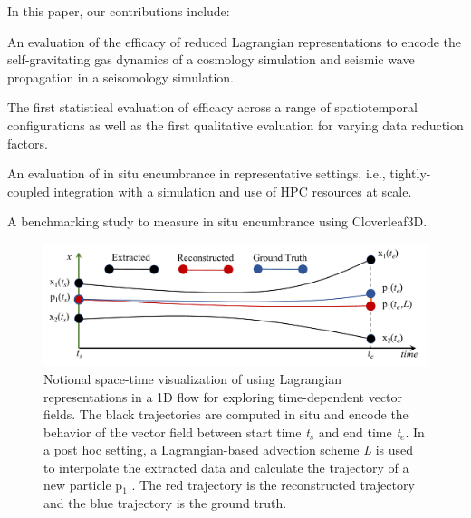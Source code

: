 In this paper, our contributions include:\begin{tightItemize}
\item An evaluation of the efficacy of reduced Lagrangian representations to encode the self-gravitating gas dynamics of a cosmology simulation and seismic wave propagation in a seisomology simulation.
\item The first statistical evaluation of efficacy across a range of spatiotemporal configurations as well as the first qualitative evaluation for varying data reduction factors.
\item An evaluation of in situ encumbrance in representative settings, i.e., tightly-coupled integration with a simulation and use of HPC resources at scale.
\item A benchmarking study to measure in situ encumbrance using Cloverleaf3D.
\end{tightItemize}

\begin{figure}[!t]
\centering
\includegraphics[width=0.8\linewidth]{Images/sample.pdf}
\vspace{-5mm}
\caption{Notional space-time visualization of using Lagrangian representations in a 1D flow for exploring time-dependent vector fields. The black trajectories are computed in situ and encode the behavior of the vector field between start time \textit{t$_{s}$} and end time \textit{t$_{e}$}. In a post hoc setting, a Lagrangian-based advection scheme \textit{L} is used to interpolate the extracted data and calculate the trajectory of a new particle p$_{1}$ . The red trajectory is the reconstructed trajectory and the blue trajectory is the ground truth.}
\vspace{-5mm}
\label{fig:sample}
\end{figure}

%
%
%
%

